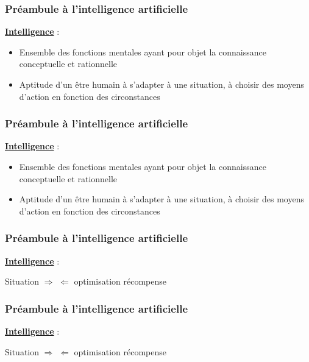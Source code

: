 \documentclass{formation}
\begin{document}
\begin{frame}
  \frametitle{Préambule à l'intelligence artificielle}
  \underline{\textbf{Intelligence}} :
  \begin{itemize}
  \item Ensemble des fonctions mentales ayant pour objet la connaissance conceptuelle et rationnelle
  \item Aptitude d'un être humain à s'adapter à une situation, à choisir des moyens d'action en fonction des circonstances
  \end{itemize}
\end{frame}

\begin{frame}
  \frametitle{Préambule à l'intelligence artificielle}
  \underline{\textbf{Intelligence}} :
  \begin{itemize}
  \item Ensemble des fonctions mentales ayant pour objet la connaissance conceptuelle et rationnelle
  \item Aptitude d'un être humain à s'adapter à une situation, à choisir des moyens d'action en fonction des circonstances
  \end{itemize}
  \begin{center}
  \end{center}
\end{frame}

\begin{frame}
  \frametitle{Préambule à l'intelligence artificielle}
  \underline{\textbf{Intelligence}} :
  \newline
  \newline
  \begin{center}
    Situation $\Rightarrow$  $\Leftarrow$ optimisation récompense
  \end{center}
\end{frame}

\begin{frame}
  \frametitle{Préambule à l'intelligence artificielle}
  \underline{\textbf{Intelligence}} :
  \newline
  \newline
  \begin{center}
    Situation $\Rightarrow$  $\Leftarrow$ optimisation récompense
    \newline
    \newline
  \end{center}
\end{frame}
\end{document}
